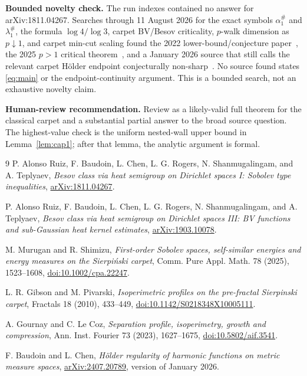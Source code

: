 \documentclass[10pt]{article}
\begin{document}
\textbf{Bounded novelty check.} The run indexes contained no answer for
arXiv:1811.04267.  Searches through 11 August 2026 for the exact symbols
$\alpha_1^\#$ and $\lambda_1^\#$, the formula $\log4/\log3$, carpet BV/Besov
criticality, $p$-walk dimension as $p\downarrow1$, and carpet min-cut scaling
found the 2022 lower-bound/conjecture paper~\cite{ABCRST3}, the 2025 $p>1$
critical theorem~\cite{MS}, and a January 2026 source that still calls the
relevant carpet H\"older endpoint conjecturally non-sharp~\cite{BC}.  No source
found states \eqref{eq:main} or the endpoint-continuity argument.  This is a
bounded search, not an exhaustive novelty claim.

\textbf{Human-review recommendation.} Review as a likely-valid full theorem
for the classical carpet and a substantial partial answer to the broad source
question.  The highest-value check is the uniform nested-wall upper bound in
Lemma~\ref{lem:cap1}; after that lemma, the analytic argument is formal.

\begin{thebibliography}{9}
P. Alonso Ruiz, F. Baudoin, L. Chen, L. G. Rogers,
N. Shanmugalingam, and A. Teplyaev,
\emph{Besov class via heat semigroup on Dirichlet spaces I: Sobolev type inequalities},
\href{https://arxiv.org/abs/1811.04267}{arXiv:1811.04267}.

P. Alonso Ruiz, F. Baudoin, L. Chen, L. G. Rogers,
N. Shanmugalingam, and A. Teplyaev,
\emph{Besov class via heat semigroup on Dirichlet spaces III: BV functions and sub-Gaussian heat kernel estimates},
\href{https://arxiv.org/abs/1903.10078}{arXiv:1903.10078}.

M. Murugan and R. Shimizu,
\emph{First-order Sobolev spaces, self-similar energies and energy measures on the Sierpi\'nski carpet},
Comm. Pure Appl. Math. 78 (2025), 1523--1608,
\href{https://doi.org/10.1002/cpa.22247}{doi:10.1002/cpa.22247}.

L. R. Gibson and M. Pivarski,
\emph{Isoperimetric profiles on the pre-fractal Sierpinski carpet},
Fractals 18 (2010), 433--449,
\href{https://doi.org/10.1142/S0218348X10005111}{doi:10.1142/S0218348X10005111}.

A. Gournay and C. Le Coz,
\emph{Separation profile, isoperimetry, growth and compression},
Ann. Inst. Fourier 73 (2023), 1627--1675,
\href{https://doi.org/10.5802/aif.3541}{doi:10.5802/aif.3541}.

F. Baudoin and L. Chen,
\emph{H\"older regularity of harmonic functions on metric measure spaces},
\href{https://arxiv.org/abs/2407.20789}{arXiv:2407.20789}, version of January 2026.
\end{thebibliography}
\end{document}
